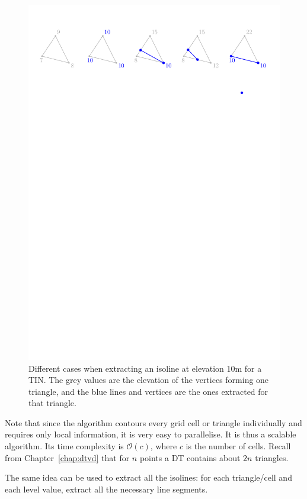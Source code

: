 \begin{figure}
  \centering
  \includegraphics[width=0.95\linewidth]{figs/isoline-tr}
\caption{Different cases when extracting an isoline at elevation 10m for a TIN. The grey values are the elevation of the vertices forming one triangle, and the blue lines and vertices are the ones extracted for that triangle.}
\label{fig:isoline-tr}
\end{figure}
Note that since the algorithm contours every grid cell or triangle individually and requires only local information, it is very easy to parallelise. 
It is thus a scalable algorithm.
Its time complexity is $\mathcal{O}(c)$, where $c$ is the number of cells.
Recall from Chapter~\ref{chap:dtvd} that for $n$ points a DT contains about $2n$ triangles.

The same idea can be used to extract all the isolines: for each triangle/cell and each level value, extract all the necessary line segments.


